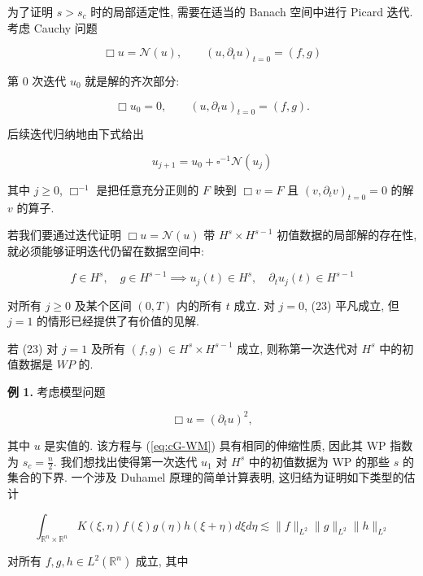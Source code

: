为了证明 $s > s_c$ 时的局部适定性, 需要在适当的 Banach 空间中进行 Picard 迭代. 考虑 Cauchy 问题

\[
\Box u = \mathcal {N} (u),  \qquad (u,  \partial_ {t} u) _ {t = 0} = (f,  g)
\]

第 0 次迭代 $u_0$ 就是解的齐次部分:

\[
\Box u _ {0} = 0,  \qquad (u,  \partial_ {t} u) _ {t = 0} = (f,  g).
\]

后续迭代归纳地由下式给出

\[
u _ {j + 1} = u _ {0} + \square^ {- 1} \mathcal {N} (u _ {j})
\]

其中 $j \geq 0$, $\Box^{-1}$ 是把任意充分正则的 $F$ 映到 $\Box v = F$ 且 $(v,  \partial_{t} v)_{t=0} = 0$ 的解 $v$ 的算子. 

若我们要通过迭代证明 $\Box u = \mathcal{N}(u)$ 带 $H^{s} \times H^{s-1}$ 初值数据的局部解的存在性, 就必须能够证明迭代仍留在数据空间中:

\begin{equation}
f \in H ^ {s},  \quad g \in H ^ {s - 1} \implies u _ {j} (t) \in H ^ {s},  \quad \partial_ {t} u _ {j} (t) \in H ^ {s - 1}\label{eq:cG-23}
\end{equation}

对所有 $j \geq 0$ 及某个区间 $(0,  T)$ 内的所有 $t$ 成立. 对 $j = 0$, (23) 平凡成立, 但 $j = 1$ 的情形已经提供了有价值的见解. 

\begin{definition}\label{def:cG-2.5}
若 (23) 对 $j = 1$ 及所有 $(f, g)\in H^{s}\times H^{s - 1}$ 成立, 则称第一次迭代对 $H^{s}$ 中的初值数据是 $WP$ 的. 
\end{definition}

\textbf{例 1.} 考虑模型问题

\[
\Box u = (\partial_ {t} u) ^ {2}, 
\]

其中 $u$ 是实值的. 该方程与 (\ref{eq:cG-WM}) 具有相同的伸缩性质, 因此其 WP 指数为 $s_c = \frac{n}{2}$. 我们想找出使得第一次迭代 $u_1$ 对 $H^s$ 中的初值数据为 WP 的那些 $s$ 的集合的下界. 一个涉及 Duhamel 原理的简单计算表明, 这归结为证明如下类型的估计

\begin{equation}
\int_ {\mathbb {R} ^ {n} \times \mathbb {R} ^ {n}} K (\xi ,  \eta) f (\xi) g (\eta) h (\xi + \eta) d \xi d \eta \lesssim \| f \| _ {L ^ {2}} \| g \| _ {L ^ {2}} \| h \| _ {L ^ {2}}\label{eq:cG-24}
\end{equation}

对所有 $f, g, h\in L^{2}(\mathbb{R}^{n})$ 成立, 其中

